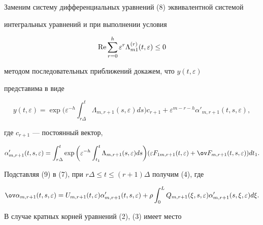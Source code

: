  


Заменим систему дифференциальных уравнений (8) эквивалентной системой 


интегральных уравнений и при выполнении условия 


$$ 


\re\sum^h_{r=0}\varepsilon^r 


\Lambda^{(r)}_{m1}(t,\varepsilon)\le0 


$$ 


методом последовательных приближений докажем, что $y(t,\varepsilon)$ 


представима в виде 


\begin{equation} 


y(t,\varepsilon)=\exp\bigg(\varepsilon^{-h} 


\int^t_{r\Delta}\Lambda_{m,r+1}(s,\varepsilon)ds\bigg) 


c_{r+1}+\varepsilon^{m-r-h}\alpha'_{m,r+1}(t,s,\varepsilon), 


\end{equation} 


где $c_{r+1}$ --- постоянный вектор, 


$$ 


\alpha'_{m,r+1}(t,s,\varepsilon)=\int^t_{r\Delta}\exp\bigg( 


\varepsilon^{-h}\int^t_{t_1}\Lambda_{m,r+1}(s,\varepsilon) 


ds\bigg)(\varepsilon F_{1m,r+1}(t,\varepsilon)+ 


\ov F_{m,r+1}(t,s,\varepsilon))dt_1. 


$$ 


Подставляя (9) в (7), при $r\Delta\le t\le(r+1)\Delta$ получим (4), где 


$$ 


\ov\alpha_{m,r+1}(t,s,\varepsilon)=U_{m,r+1}(t,\varepsilon) 


\alpha'_{m,r+1}(t,s,\varepsilon)+\rho\int^L_0 


Q_{m,r+1}(\xi,s,\varepsilon)\alpha'_{m,r+1} 


(s,\xi,\varepsilon)d\xi. 


$$ 


 


В случае кратных корней уравнений (2), (3) имеет место 


 


